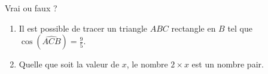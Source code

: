 
\begin{mental}
    Vrai ou faux ?
    \begin{enumerate}
        \item
            Il est possible de tracer un triangle \( ABC\) rectangle en \( B\) tel que \( \cos(\widehat{ACB})=\frac{ 9 }{ 5 }\).
        \item
            Quelle que soit la valeur de \( x\), le nombre \(   2\times x \) est un nombre pair.
    \end{enumerate}
\end{mental}

